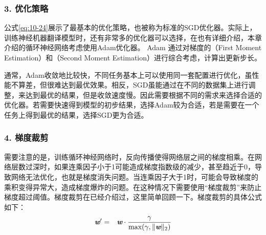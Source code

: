 \vspace{-2.5em}
\subsubsection{3. 优化策略}

\parinterval 公式\eqref{eq:10-24}展示了最基本的优化策略，也被称为标准的SGD优化器。实际上，训练神经机器翻译模型时，还有非常多的优化器可以选择，在{\chapternine}也有详细介绍，本章介绍的循环神经网络考虑使用Adam优化器。 Adam 通过对梯度的{\small{}}（First Moment Estimation）和{\small{}}（Second Moment Estimation）进行综合考虑，计算出更新步长。

\parinterval 通常，Adam收敛地比较快，不同任务基本上可以使用同一套配置进行优化，虽性能不算差，但很难达到最优效果。相反，SGD虽能通过在不同的数据集上进行调整，来达到最优的结果，但是收敛速度慢。因此需要根据不同的需求来选择合适的优化器。若需要快速得到模型的初步结果，选择Adam较为合适，若是需要在一个任务上得到最优的结果，选择SGD更为合适。


\subsubsection{4. 梯度裁剪}

\parinterval 需要注意的是，训练循环神经网络时，反向传播使得网络层之间的梯度相乘。在网络层数过深时，如果连乘因子小于1可能造成梯度指数级的减少，甚至趋近于0，导致网络无法优化，也就是梯度消失问题。当连乘因子大于1时，可能会导致梯度的乘积变得异常大，造成梯度爆炸的问题。在这种情况下需要使用“梯度裁剪”来防止梯度超过阈值。梯度裁剪在{\chapternine}已经介绍过，这里简单回顾一下。梯度裁剪的具体公式如下：
\vspace{-0.5em}
\begin{eqnarray}
\textbf{\em w}' &=& \textbf{\em w} \cdot \frac{\gamma} {\textrm{max}(\gamma,\| \textbf{\em w} \|_2)}
\label{eq:10-28}
\end{eqnarray}

